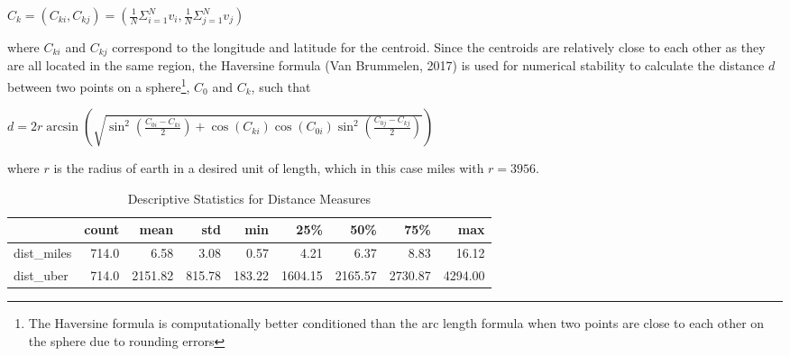 \documentclass{article}
\begin{document}
\begin{center}
    $C_k = (C_{ki}, C_{kj})  = (\frac{1}{N} \Sigma_{i=1}^{N} v_i, \frac{1}{N} \Sigma_{j=1}^{N} v_j) $
\end{center}

where $C_{ki}$ and $C_{kj}$ correspond to the longitude and latitude for the centroid. Since the centroids are relatively close to each other as they are all located in the same region, the Haversine formula (Van Brummelen, 2017) is used for numerical stability to calculate the distance $d$ between two points on a sphere\footnote{The Haversine formula is computationally better conditioned than the arc length formula when two points are close to each other on the sphere due to rounding errors}, $C_0$ and $C_k$, such that

\begin{center}
    $d =2 r \arcsin \left(\sqrt{\sin ^{2}\left(\frac{C_{0i}-C_{ki}}{2}\right)+\cos \left(C_{ki}\right) \cos \left(C_{0i}\right) \sin ^{2}\left(\frac{C_{0j}-C_{kj}}{2}\right)}\right)$
\end{center}

where $r$ is the radius of earth in a desired unit of length, which in this case miles with $r = 3956$. 

\begin{table}[t]
\centering
\caption{Descriptive Statistics for Distance Measures} 
  \label{table:distance} 
\begin{tabular}{lrrrrrrrr}
\toprule
{} &  count &     mean &     std &     min &      25\% &      50\% &      75\% &      max \\
\midrule
dist\_miles     &  714.0 &     6.58 &    3.08 &    0.57 &     4.21 &     6.37 &     8.83 &    16.12 \\
dist\_uber &  714.0 &  2151.82 &  815.78 &  183.22 &  1604.15 &  2165.57 &  2730.87 &  4294.00 \\
\bottomrule
\end{tabular}
\end{table}
\end{document}
